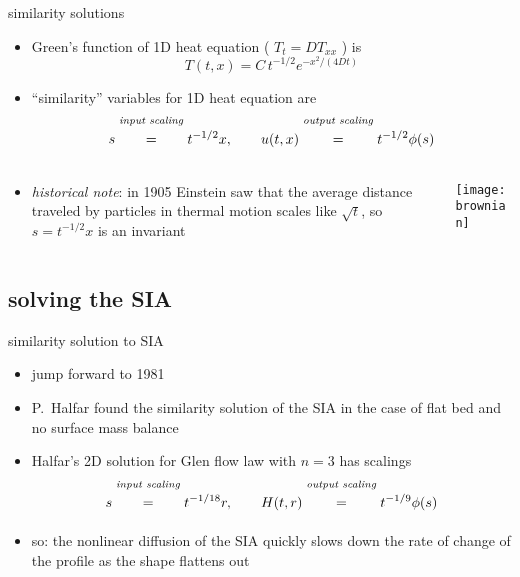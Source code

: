 \begin{frame}{similarity solutions}

\begin{itemize}
\item Green's function of 1D heat equation ( $T_t=D T_{xx}$ ) is
	$$T(t,x) = C\, t^{-1/2} e^{-x^2/(4Dt)}$$
\item ``similarity'' variables for 1D heat equation are
	$$s \stackrel{\text{\emph{input scaling}}}{\phantom{\Big|}=\phantom{\Big|}} t^{-1/2} x, \qquad u(t,x) \stackrel{\text{\emph{output scaling}}}{\phantom{\Big|}=\phantom{\Big|}} t^{-1/2} \phi(s)$$
\end{itemize}
\begin{columns}
\begin{column}{0.6\textwidth}
\begin{itemize}
\item \emph{historical note}:  in 1905 Einstein saw that the average distance traveled by particles in thermal motion scales like $\sqrt{t}$, so $s = t^{-1/2}x$ is an invariant
\end{itemize}
\end{column}
\begin{column}{0.4\textwidth}
\begin{center}
\texttt{[image: brownian]}
\end{center}
\end{column}
\end{columns}

\end{frame}


\subsection{solving the SIA}

\begin{frame}{similarity solution to SIA}

\begin{itemize}
\item jump forward to 1981
\item P.~Halfar found the similarity solution of the SIA in the case of flat bed and no surface mass balance
\item Halfar's 2D solution for Glen flow law with $n=3$ has scalings
	$$s \stackrel{\text{\emph{input scaling}}}{\phantom{\Big|}=\phantom{\Big|}} t^{-1/18} r, \qquad H(t,r) \stackrel{\text{\emph{output scaling}}}{\phantom{\Big|}=\phantom{\Big|}} t^{-1/9} \phi(s)$$
\item so: the nonlinear diffusion of the SIA quickly slows down the rate of change of the profile as the shape flattens out
\end{itemize}
\end{frame}


